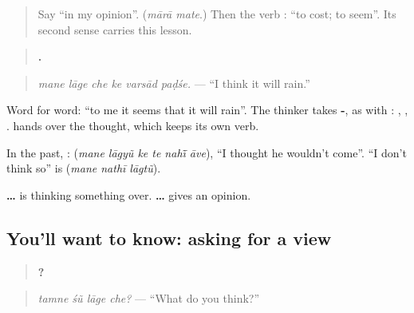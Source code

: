 \label{lesson:GU-C277-mane-lage-che}



\begin{quote}
Say \textquotedblleft{}in my opinion\textquotedblright{}. (\emph{mārā mate}.) Then the verb \textbf{}: \textquotedblleft{}to cost; to seem\textquotedblright{}. Its second sense carries this lesson.
\end{quote}

\begin{grammarlens}[title={Grammar Lens: it seems to me}]
\begin{quote}
\textbf{     .}
\end{quote}

\begin{quote}
\emph{mane lāge che ke varsād paḍśe.} — \textquotedblleft{}I think it will rain.\textquotedblright{}
\end{quote}

Word for word: \textquotedblleft{}to me it seems that it will rain\textquotedblright{}. The thinker takes \textbf{-}, as with \textbf{  }: \textbf{}, \textbf{}, \textbf{}. \textbf{} hands over the thought, which keeps its own verb.

In the past, \textbf{}: \textbf{     } (\emph{mane lāgyũ ke te nahī̃ āve}), \textquotedblleft{}I thought he wouldn't come\textquotedblright{}. \textquotedblleft{}I don't think so\textquotedblright{} is \textbf{  } (\emph{mane nathī lāgtũ}).

\textbf{    …} is thinking something over. \textbf{    …} gives an opinion.
\end{grammarlens}

\subsection*{You'll want to know: asking for a view}
\begin{quote}
\textbf{   ?}
\end{quote}

\begin{quote}
\emph{tamne śũ lāge che?} — \textquotedblleft{}What do you think?\textquotedblright{}
\end{quote}

